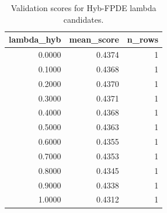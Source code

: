 \begin{table}[t]
\caption{Validation scores for Hyb-FPDE lambda candidates.}
\label{tab:lambda_distribution_computed}
\centering
\begin{tabular}{rrr}
\toprule
lambda\_hyb & mean\_score & n\_rows \\
\midrule
0.0000 & 0.4374 & 1 \\
0.1000 & 0.4368 & 1 \\
0.2000 & 0.4370 & 1 \\
0.3000 & 0.4371 & 1 \\
0.4000 & 0.4368 & 1 \\
0.5000 & 0.4363 & 1 \\
0.6000 & 0.4355 & 1 \\
0.7000 & 0.4353 & 1 \\
0.8000 & 0.4345 & 1 \\
0.9000 & 0.4338 & 1 \\
1.0000 & 0.4312 & 1 \\
\bottomrule
\end{tabular}

\end{table}
